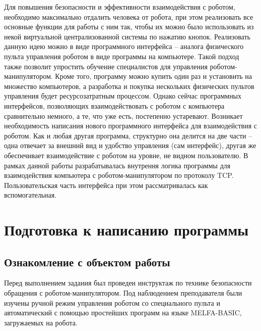 \documentclass[a4paper,14pt]{extarticle}
\begin{document}
Для повышения безопасности и эффективности
взаимодействия с роботом,
необходимо максимально отдалить человека
от робота, при этом реализовать все основные
функции для работы с ним так, чтобы их можно
было использовать из некой виртуальной централизованной
системы по нажатию кнопок. Реализовать данную идею
можно в виде программного интерфейса -- аналога физического
пульта управления роботом в
виде программы на компьютере.
Такой подход также
позволит упростить обучение специалистов для управления
роботом-манипулятором. Кроме того, программу можно
купить один раз и установить на множество компьютеров,
а разработка и покупка нескольких физических пультов управления
будет ресурсозатратным процессом.
Однако сейчас программных интерфейсов, позволяющих взаимодействовать
с роботом с компьютера сравнительно немного,
а те, что уже есть, постепенно устаревают.
Возникает необходимость написания нового
программного интерфейса для взаимодействия с роботом.
Как и любая другая программа, структурно она делится на две
части -- одна отвечает за внешний вид
и удобство управления (сам интерфейс),
другая же обеспечивает взаимодействие с роботом
на уровне, не видном пользователю.
В рамках данной работы разрабатывалась
внутрення логика программы для
взаимодействия компьютера с
роботом-манипулятором по протоколу TCP.
Пользовательская часть интерфейса при этом рассматривалась как вспомогательная.


\section{Подготовка к написанию программы}
\subsection{Ознакомление с объектом работы}
Перед выполнением задания был проведен
инструктаж по технике безопасности обращения
с роботом-манипулятором. Под наблюдением преподавателя
были изучены ручной режим
управления роботом со специального пульта и
автоматический с помощью простейших программ
на языке MELFA-BASIC, загружаемых на робота.
\end{document}
